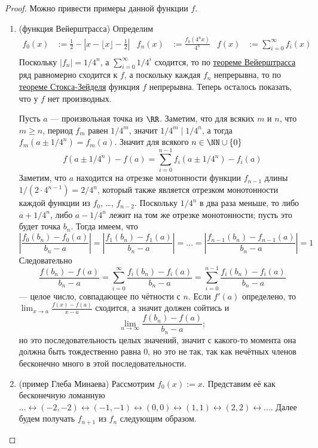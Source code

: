 \documentclass[12pt,a4paper]{article}
\begin{document}
    \begin{proof}
        Можно привести примеры данной функции $f$.
        \begin{enumerate}
            \item (функция Вейерштрасса) Определим
                \begin{align*}
                    f_0(x) &:= \frac{1}{2} - \left|x - \lfloor x \rfloor - \frac{1}{2}\right|&
                    f_n(x) &:= \frac{f_0(4^n x)}{4^n}&
                    f(x) &:= \sum_{i = 0}^\infty f_i(x)\\
                \end{align*}
                Поскольку $|f_n| = 1/4^n$, а $\sum_{i = 0}^\infty 1/4^i$ сходится, то по \hyperref[Weierstrass_uniform_convergence_theorem]{теореме Вейерштрасса} ряд равномерно сходится к $f$, а поскольку каждая $f_n$ непрерывна, то по \hyperref[Stokes_Zaidel_theorem]{теореме Стокса-Зейделя} функция $f$ непрерывна. Теперь осталось показать, что у $f$ нет производных.

                Пусть $a$ --- произвольная точка из $\RR$. Заметим, что для всяких $m$ и $n$, что $m \geqslant n$, период $f_m$ равен $1/4^m$, значит $1/4^m \mid 1/4^n$, а тогда $f_m(a \pm 1/4^n) = f_m(a)$. Значит для всякого $n \in \NN \cup \{0\}$
                \[f(a \pm 1/4^n) - f(a) = \sum_{i=0}^{n-1} f_i(a \pm 1/4^n) - f_i(a)\]
                Заметим, что $a$ находится на отрезке монотонности функции $f_{n-1}$ длины $1/(2 \cdot 4^{n-1})=2/4^n$, который также является отрезком монотонности каждой функции из $f_0$, \dots, $f_{n-2}$. Поскольку $1/4^n$ в два раза меньше, то либо $a + 1/4^n$, либо $a - 1/4^n$ лежит на том же отрезке монотонности; пусть это будет точка $b_n$. Тогда имеем, что
                \[
                    \left|\frac{f_0(b_n) - f_0(a)}{b_n - a}\right|
                    = \left|\frac{f_1(b_n) - f_1(a)}{b_n - a}\right|
                    = \dots
                    = \left|\frac{f_{n-1}(b_n) - f_{n-1}(a)}{b_n - a}\right|
                    = 1\]
                Следовательно
                \[
                    \frac{f(b_n) - f(a)}{b_n - a}
                    = \sum_{i=0}^\infty \frac{f_i(b_n) - f_i(a)}{b_n - a}
                    = \sum_{i=0}^{n-1} \frac{f_i(b_n) - f_i(a)}{b_n - a}
                \]
                --- целое число, совпадающее по чётности с $n$. Если $f'(a)$ определено, то $\lim_{x \to a} \frac{f(x) - f(a)}{x-a}$ сходится, а значит должен сойтись и
                \[\lim_{n \to \infty} \frac{f(b_n) - f(a)}{b_n - a};\]
                но это последовательность целых значений, значит с какого-то момента она должна быть тождественно равна $0$, но это не так, так как нечётных членов бесконечно много в этой последовательности.
            \item (пример Глеба Минаева) Рассмотрим $f_0(x) := x$. Представим её как бесконечную ломанную $\dots \leftrightarrow (-2, -2) \leftrightarrow (-1, -1) \leftrightarrow (0, 0) \leftrightarrow (1, 1) \leftrightarrow (2, 2) \leftrightarrow ...$. Далее будем получать $f_{n+1}$ из $f_n$ следующим образом.


\end{enumerate}
\end{proof}
\end{document}
